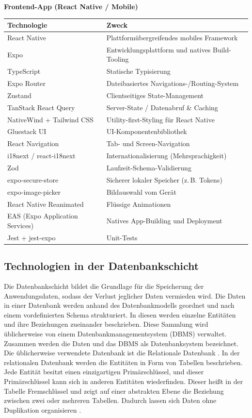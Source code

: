 \vspace{6em}

\textbf{Frontend-App (React Native / Mobile)}

\begin{tabular}{|p{5cm}|p{}|}
\hline
\textbf{Technologie} & \textbf{Zweck} \\
\hline
React Native & Plattformübergreifendes mobiles Framework \\
\hline
Expo & Entwicklungsplattform und natives Build-Tooling \\
\hline
TypeScript & Statische Typisierung \\
\hline
Expo Router & Dateibasiertes Navigations-/Routing-System \\
\hline
Zustand & Clientseitiges State-Management \\
\hline
TanStack React Query & Server-State / Datenabruf \& Caching \\
\hline
NativeWind + Tailwind CSS & Utility-first-Styling für React Native \\
\hline
Gluestack UI & UI-Komponentenbibliothek \\
\hline
React Navigation & Tab- und Screen-Navigation \\
\hline
i18next / react-i18next & Internationalisierung (Mehrsprachigkeit) \\
\hline
Zod & Laufzeit-Schema-Validierung \\
\hline
expo-secure-store & Sicherer lokaler Speicher (z.\,B. Tokens) \\
\hline
expo-image-picker & Bildauswahl vom Gerät \\
\hline
React Native Reanimated & Flüssige Animationen \\
\hline
EAS (Expo Application Services) & Natives App-Building und Deployment \\
\hline
Jest + jest-expo & Unit-Tests \\
\hline
\end{tabular}

\subsection{Technologien in der Datenbankschicht}

Die Datenbankschicht bildet die Grundlage für die Speicherung der Anwendungsdaten, sodass der Verlust jeglicher Daten vermieden wird. Die Daten in einer Datenbank werden anhand des Datenbankmodells geordnet und nach einem vordefinierten Schema strukturiert. In diesen werden einzelne Entitäten und ihre Beziehungen zueinander beschrieben. Diese Sammlung wird üblicherweise von einem Datenbankmanagementsystem (DBMS) verwaltet. Zusammen werden die Daten und das DBMS als Datenbanksystem bezeichnet. Die üblicherweise verwendete Datenbank ist die Relationale Datenbank \cite{halvorsen2017database}. In der relationalen Datenbank werden die Entitäten in Form von Tabellen beschrieben. Jede Entität besitzt einen einzigartigen Primärschlüssel, und dieser Primärschlüssel kann sich in anderen Entitäten wiederfinden. Dieser heißt in der Tabelle Fremschlüssel und zeigt auf einer abstrakten Ebene die Beziehung zwischen zwei oder mehreren Tabellen. Dadurch lassen sich Daten ohne Duplikation organisieren \cite{}.

